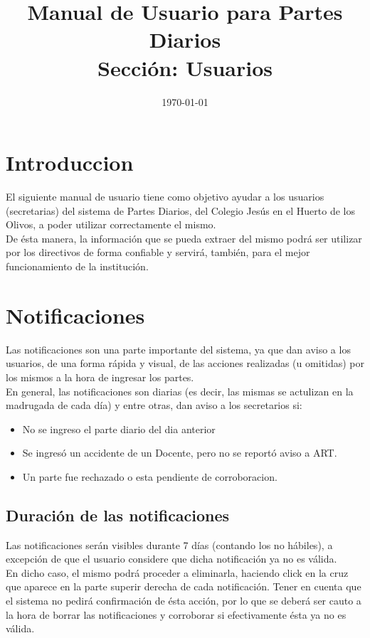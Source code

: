 \documentclass[12pt,a4paper]{article}
\title{Manual de Usuario para Partes Diarios \\ Sección: Usuarios}
\begin{document}
\date{\today}
\maketitle

\section{Introduccion}

El siguiente manual de usuario tiene como objetivo ayudar a los usuarios (secretarias) del sistema de Partes Diarios, del Colegio Jesús en el Huerto de los Olivos, a poder utilizar correctamente el mismo. \\
De ésta manera, la información que se pueda extraer del mismo podrá ser utilizar por los directivos de forma confiable y servirá, también, para el mejor funcionamiento de la institución.

\section{Notificaciones}
Las notificaciones son una parte importante del sistema, ya que dan aviso a los usuarios, de una forma rápida y visual, de las acciones realizadas (u omitidas) por los mismos a la hora de ingresar los partes. \\
En general, las notificaciones son diarias (es decir, las mismas se actulizan en la madrugada de cada día) y entre otras, dan aviso a los secretarios si:
\begin{itemize}
	\item No se ingreso el parte diario del dia anterior
	\item Se ingresó un accidente de un Docente, pero no se reportó aviso a ART.
	\item Un parte fue rechazado o esta pendiente de corroboracion.
\end{itemize}

\subsection{Duración de las notificaciones}
Las notificaciones serán visibles durante 7 días (contando los no hábiles), a excepción de que el usuario considere que dicha notificación ya no es válida. \\
En dicho caso, el mismo podrá proceder a eliminarla, haciendo click en  la cruz que aparece en la parte superir derecha de cada notificación. Tener en cuenta que el sistema no pedirá confirmación de ésta acción, por lo que se deberá ser cauto a la hora de borrar las notificaciones y corroborar si efectivamente ésta ya no es válida.
\end{document}
